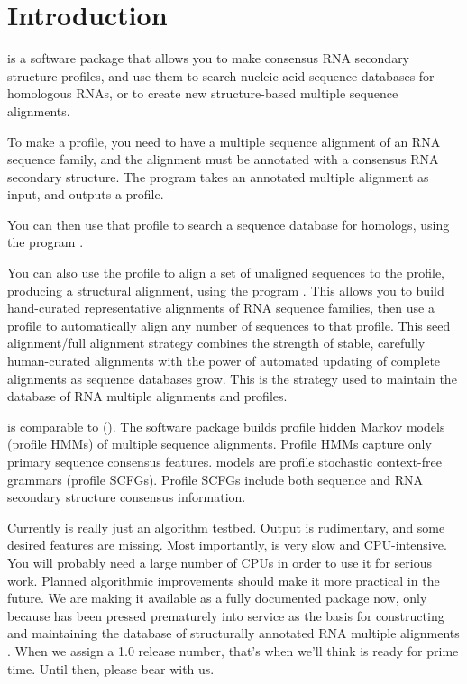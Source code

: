 \section{Introduction}

 is a software package that allows you to make
consensus RNA secondary structure profiles, and use them to search
nucleic acid sequence databases for homologous RNAs, or to create new
structure-based multiple sequence alignments.

To make a profile, you need to have a multiple sequence alignment of
an RNA sequence family, and the alignment must be annotated with a
consensus RNA secondary structure. The program  takes an
annotated multiple alignment as input, and outputs a profile.

You can then use that profile to search a sequence database for homologs,
using the program .

You can also use the profile to align a set of unaligned sequences to
the profile, producing a structural alignment, using the program
. This allows you to build hand-curated representative
alignments of RNA sequence families, then use a profile to
automatically align any number of sequences to that profile.  This
seed alignment/full alignment strategy combines the strength of
stable, carefully human-curated alignments with the power of automated
updating of complete alignments as sequence databases grow. This is
the strategy used to maintain the  database of RNA
multiple alignments and profiles.

 is comparable to 
().  The
 software package builds profile hidden Markov models
(profile HMMs) of multiple sequence alignments. Profile HMMs capture
only primary sequence consensus features.  models
are profile stochastic context-free grammars (profile SCFGs).  Profile
SCFGs include both sequence and RNA secondary structure consensus
information.

Currently  is really just an algorithm
testbed. Output is rudimentary, and some desired features are
missing. Most importantly,  is very slow and
CPU-intensive. You will probably need a large number of CPUs in order
to use it for serious work. Planned algorithmic improvements should
make it more practical in the future. We are making it available as a
fully documented package now, only because  has
been pressed prematurely into service as the basis for constructing
and maintaining the  database of structurally annotated
RNA multiple alignments \cite{Griffiths-Jones03}. When we assign a 1.0
release number, that's when we'll think  is ready
for prime time. Until then, please bear with us.












